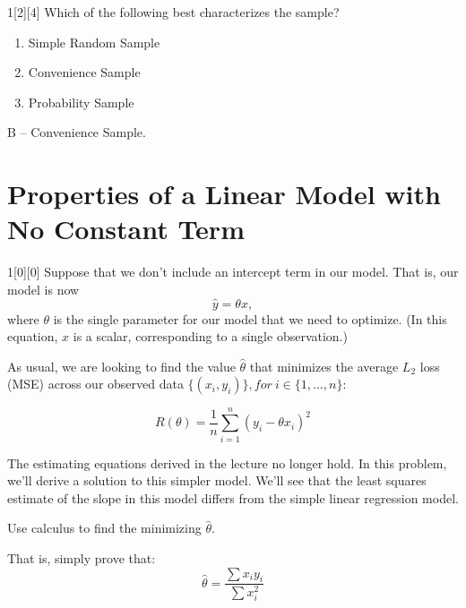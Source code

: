 \documentclass{article}
\begin{document}
\begin{dshw}{1}[2][4]
	Which of the following best characterizes the sample?
	\begin{enumerate}[label=\Alph*.]
		\item Simple Random Sample
		\item Convenience Sample
		\item Probability Sample
	\end{enumerate}
\end{dshw}
\begin{solution}
	B -- Convenience Sample.
\end{solution}

\newpage

\section{Properties of a Linear Model with No Constant Term}
\begin{dshw}{1}[0][0]
	Suppose that we don't include an intercept term in
	our model. That is, our model is now
	$$\hat{y} = \theta x,$$
	where $\theta$ is the single parameter for our model that we need to optimize. (In this equation, $x$ is a scalar, corresponding to a single observation.)
	
	As usual, we are looking to find the value $\hat{\theta}$ that minimizes the average $L_2$ loss (MSE) across our observed data $\{(x_i, y_i)\}, for\ i\in \{1, \ldots, n\}$:
	
	$$R(\theta) = \frac{1}{n}\sum_{i=1}^n (y_i - \theta x_i)^2$$
	
	The estimating equations derived in the lecture no longer hold. In this problem, we'll derive a solution to this simpler model. We'll see that the least squares estimate of the slope in this model differs from the simple linear regression model.
	
	
	Use calculus to find the minimizing $\hat{\theta}$. 
	
	That is, simply prove that: 
	$$ \hat{\theta} = \frac{\sum x_iy_i}{\sum x_i^2}$$
\end{dshw}
\end{document}
